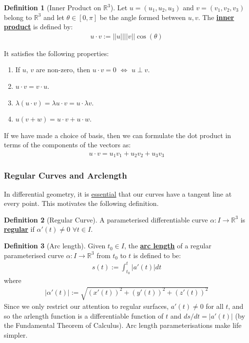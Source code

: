 \documentclass[11pt]{scrartcl}
\newcommand{\R}[0]{\mathbb{R}}
\theoremstyle{definition}
\newtheorem{definition}{Definition}
\theoremstyle{remark}
\newcommand{\dfn}[1]{\textbf{\underline{#1}}}
\newcommand{\idx}[2]{\int_{#1}^{#2}}
\begin{document}
{\begin{definition}[Inner Product on $\R^3$] 
	Let $u = (u_1, u_2, u_3)$ and $v= (v_1, v_2, v_3)$ belong to $\R^3$ and let $\theta \in [0, \pi]$ be the angle formed between $u,v$. The \dfn{inner product} is defined by: 
	\begin{align}
		u \cdot v := || u || ||v|| \cos (\theta) 	
	\end{align}
\end{definition}
It satisfies the following properties: 
\begin{enumerate}[noitemsep]
	\item If $u$, $v$ are non-zero, then $u \cdot v = 0$ $\iff$ $u \perp v$. 
	\item $u \cdot v = v \cdot u$. 
	\item $\lambda (u \cdot v ) = \lambda u \cdot v =  u \cdot \lambda v$. 
	\item $u ( v + w) = u \cdot v + u \cdot w$. 
\end{enumerate}
If we have made a choice of basis, then we can formulate the dot product in terms of the components of the vectors as: 
\begin{align}
	u \cdot v = u_1 v_1 + u_2 v_2 + u_3 v_3 	
\end{align}

\subsubsection{Regular Curves and Arclength}
In differential geometry, it is \underline{essential} that our curves have a tangent line at every point. This motivates the following definition. 

\begin{definition}[Regular Curve]
	A parameterised differentiable curve $\alpha: I \rightarrow \R^3$ is \dfn{regular} if $\alpha' (t) \neq 0$ $\forall t \in I$. 
\end{definition}

\begin{definition}[Arc length]
	Given $t_0 \in I$, the \dfn{arc length} of a regular parameterised curve $\alpha: I \rightarrow \R^3$ from $t_0$ to $t$ is defined to be: 
	\begin{align*}
		s(t) := \idx{t_0}{t} | a'(t) | dt 
	\end{align*}
	where
	\begin{align*}
		| \alpha' (t) | := \sqrt{(x'(t))^2 + (y'(t))^2 + (z'(t))^2}
	\end{align*}
	Since we only restrict our attention to regular surfaces, $a'(t) \neq 0$ for all $t$, and so the arlength function is a differentiable function of $t$ and $ds/dt = |a'(t)|$ (by the Fundamental Theorem of Calculus). Arc length parameterisations make life simpler. 
\end{definition}

}
\end{document}
